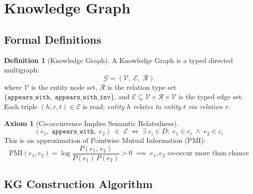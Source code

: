 \documentclass[12pt, a4paper]{article}
\theoremstyle{definition}
\newtheorem{definition}{Definition}[section]
\newtheorem{axiom}{Axiom}[section]
\theoremstyle{plain}
\theoremstyle{remark}
\begin{document}
\section{Knowledge Graph}
\label{sec:kg}

\subsection{Formal Definitions}

\begin{definition}[Knowledge Graph]
A Knowledge Graph is a typed directed multigraph:
\[
  \mathcal{G} = (\mathcal{V},\;\mathcal{E},\;\mathcal{R})
\]
where $\mathcal{V}$ is the entity node set, $\mathcal{R}$ is the relation
type set $\{\texttt{appears\_with},\;\texttt{appears\_with\_inv}\}$, and
$\mathcal{E} \subseteq \mathcal{V}\times\mathcal{R}\times\mathcal{V}$ is the
typed edge set.  Each triple $(h, r, t) \in \mathcal{E}$ is read:
\emph{entity $h$ relates to entity $t$ via relation $r$}.
\end{definition}

\begin{axiom}[Co-occurrence Implies Semantic Relatedness]
\[
  (e_1,\;\texttt{appears\_with},\;e_2) \;\in\; \mathcal{E}
  \;\iff\;
  \exists\;c_i \in D:\; e_1 \in c_i \;\wedge\; e_2 \in c_i
\]
This is an approximation of Pointwise Mutual Information (PMI):
\[
  \mathrm{PMI}(e_1, e_2) = \log\frac{P(e_1,\,e_2)}{P(e_1)\,P(e_2)} > 0
  \;\implies\; e_1, e_2 \text{ co-occur more than chance}
\]
\end{axiom}

\subsection{KG Construction Algorithm}
\end{document}
